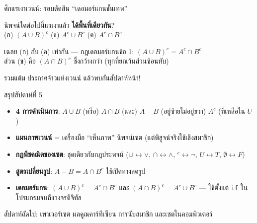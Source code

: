 \begin{frame}{ศึกแรเงาเวนน์: รอบตัดสิน ``เดอมอร์แกนขั้นเทพ'' }
  \begin{center}
    {\Large นิพจน์ใดต่อไปนี้แรเงาแล้ว \textbf{ได้พื้นที่เดียวกัน}?} \\[0.6em]
    {\large (ก) $(A \cup B)^c$ \qquad (ข) $A^c \cup B^c$ \qquad (ค) $A^c \cap B^c$}
  \end{center}
  \pause
  \vspace{0.5em}
  \begin{exampleblock}{เฉลย}
    (ก) กับ (ค) เท่ากัน --- กฎเดอมอร์แกนข้อ 1: $(A \cup B)^c = A^c \cap B^c$ \\
    ส่วน (ข) คือ $(A \cap B)^c$ ซึ่งกว้างกว่า (ทุกที่ยกเว้นส่วนซ้อนทับ)
  \end{exampleblock}
  \pause
  \begin{center}
    รวมแต้ม ประกาศจ้าวแห่งเวนน์ แล้วพบกันสัปดาห์หน้า!
  \end{center}
\end{frame}


\begin{frame}{สรุปสัปดาห์ที่ 5}
  \begin{itemize}
    \item \textbf{4 การดำเนินการ}: $A \cup B$ (หรือ) \quad $A \cap B$ (และ) \quad
          $A - B$ (อยู่ซ้ายไม่อยู่ขวา) \quad $A^c$ (ที่เหลือใน $U$)
    \item \textbf{แผนภาพเวนน์} = เครื่องมือ ``เห็นภาพ'' นิพจน์เซต (แต่พิสูจน์จริงใช้เชิงสมาชิก)
    \item \textbf{กฎพีชคณิตของเซต}: ชุดเดียวกับกฎประพจน์ ($\cup \leftrightarrow \lor$,
          $\cap \leftrightarrow \land$, $^c \leftrightarrow \neg$, $U \leftrightarrow T$, $\emptyset \leftrightarrow F$)
    \item \textbf{สูตรเปลี่ยนรูป}: $A - B = A \cap B^c$ ใช้เปิดทางลดรูป
    \item \textbf{เดอมอร์แกน}: $(A \cup B)^c = A^c \cap B^c$ และ $(A \cap B)^c = A^c \cup B^c$
          --- ใช้ตั้งแต่ \texttt{if} ในโปรแกรมจนถึงวงจรดิจิทัล
  \end{itemize}
  \begin{exampleblock}{}
    \centering สัปดาห์ถัดไป: เพาเวอร์เซต ผลคูณคาร์ทีเซียน การนับสมาชิก และเซตในคอมพิวเตอร์
  \end{exampleblock}
\end{frame}

